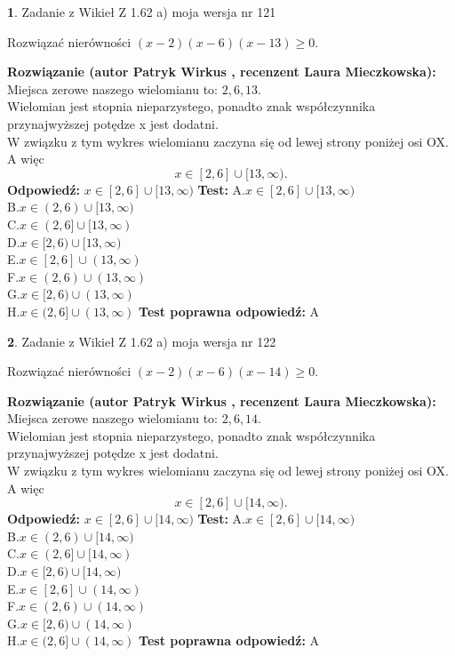 \documentclass[12pt, a4paper]{article}
\theoremstyle{definition} %
\newtheorem{zad}{}
\newcommand{\zadStart}[1]{\begin{zad}#1\newline}
\newcommand{\zadStop}{\end{zad}}
\newcommand{\rozwStart}[2]{\noindent \textbf{Rozwiązanie (autor #1 , recenzent #2): }\newline}
\newcommand{\rozwStop}{\newline}
\newcommand{\odpStart}{\noindent \textbf{Odpowiedź:}\newline}
\newcommand{\odpStop}{\newline}
\newcommand{\testStart}{\noindent \textbf{Test:}\newline}
\newcommand{\testStop}{\newline}
\newcommand{\kluczStart}{\noindent \textbf{Test poprawna odpowiedź:}\newline}
\newcommand{\kluczStop}{\newline}
\begin{document}
\zadStart{Zadanie z Wikieł Z 1.62 a) moja wersja nr 121}

Rozwiązać nierówności $(x-2)(x-6)(x-13)\ge0$.
\zadStop
\rozwStart{Patryk Wirkus}{Laura Mieczkowska}
Miejsca zerowe naszego wielomianu to: $2, 6, 13$.\\
Wielomian jest stopnia nieparzystego, ponadto znak współczynnika przy\linebreak najwyższej potędze x jest dodatni.\\ W związku z tym wykres wielomianu zaczyna się od lewej strony poniżej osi OX. A więc $$x \in [2,6] \cup [13,\infty).$$
\rozwStop
\odpStart
$x \in [2,6] \cup [13,\infty)$
\odpStop
\testStart
A.$x \in [2,6] \cup [13,\infty)$\\
B.$x \in (2,6) \cup [13,\infty)$\\
C.$x \in (2,6] \cup [13,\infty)$\\
D.$x \in [2,6) \cup [13,\infty)$\\
E.$x \in [2,6] \cup (13,\infty)$\\
F.$x \in (2,6) \cup (13,\infty)$\\
G.$x \in [2,6) \cup (13,\infty)$\\
H.$x \in (2,6] \cup (13,\infty)$
\testStop
\kluczStart
A
\kluczStop



\zadStart{Zadanie z Wikieł Z 1.62 a) moja wersja nr 122}

Rozwiązać nierówności $(x-2)(x-6)(x-14)\ge0$.
\zadStop
\rozwStart{Patryk Wirkus}{Laura Mieczkowska}
Miejsca zerowe naszego wielomianu to: $2, 6, 14$.\\
Wielomian jest stopnia nieparzystego, ponadto znak współczynnika przy\linebreak najwyższej potędze x jest dodatni.\\ W związku z tym wykres wielomianu zaczyna się od lewej strony poniżej osi OX. A więc $$x \in [2,6] \cup [14,\infty).$$
\rozwStop
\odpStart
$x \in [2,6] \cup [14,\infty)$
\odpStop
\testStart
A.$x \in [2,6] \cup [14,\infty)$\\
B.$x \in (2,6) \cup [14,\infty)$\\
C.$x \in (2,6] \cup [14,\infty)$\\
D.$x \in [2,6) \cup [14,\infty)$\\
E.$x \in [2,6] \cup (14,\infty)$\\
F.$x \in (2,6) \cup (14,\infty)$\\
G.$x \in [2,6) \cup (14,\infty)$\\
H.$x \in (2,6] \cup (14,\infty)$
\testStop
\kluczStart
A
\kluczStop
\end{document}
